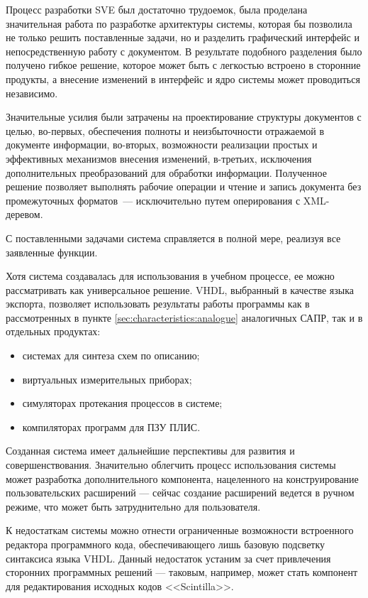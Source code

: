 Процесс разработки SVE был достаточно трудоемок, была проделана значительная работа по разработке архитектуры системы, которая бы позволила не только решить поставленные задачи, но и разделить графический интерфейс и непосредственную работу с документом.
В результате подобного разделения было получено гибкое решение, которое может быть с легкостью встроено в сторонние продукты, а внесение изменений в интерфейс и ядро системы может проводиться независимо.

Значительные усилия были затрачены на проектирование структуры документов с целью, во-первых, обеспечения полноты и неизбыточности отражаемой в документе информации, во-вторых, возможности реализации простых и эффективных механизмов внесения изменений, в-третьих, исключения дополнительных преобразований для обработки информации.
Полученное решение позволяет выполнять рабочие операции и чтение и запись документа без промежуточных форматов~--- исключительно путем оперирования с XML-деревом.

С поставленными задачами система справляется в полной мере, реализуя все заявленные функции.

Хотя система создавалась для использования в учебном процессе, ее можно рассматривать как универсальное решение.
VHDL, выбранный в качестве языка экспорта, позволяет использовать результаты работы программы как в рассмотренных в пункте \ref{sec:characteristics:analogue} аналогичных САПР, так и в отдельных продуктах:
\begin{itemize}
  \item системах для синтеза схем по описанию;
  \item виртуальных измерительных приборах;
  \item симуляторах протекания процессов в системе;
  \item компиляторах программ для ПЗУ ПЛИС.
\end{itemize}

Созданная система имеет дальнейшие перспективы для развития и совершенствования.
Значительно облегчить процесс использования системы может разработка дополнительного компонента, нацеленного на конструирование пользовательских расширений --- сейчас создание расширений ведется в ручном режиме, что может быть затруднительно для пользователя.

К недостаткам системы можно отнести ограниченные возможности встроенного редактора программного кода, обеспечивающего лишь базовую подсветку синтаксиса языка VHDL.
Данный недостаток устаним за счет привлечения сторонних программных решений --- таковым, например, может стать компонент для редактирования исходных кодов <<Scintilla>>.

